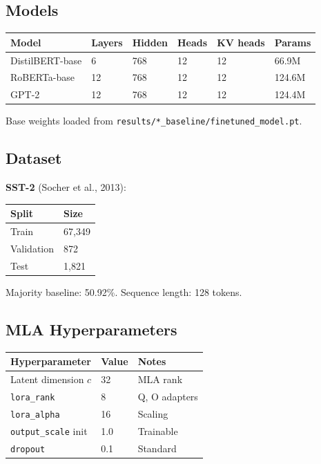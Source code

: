 \subsection{Models}

\begin{table}[H]
\centering
\small
\begin{tabular}{llllll}
\toprule
\textbf{Model} & \textbf{Layers} & \textbf{Hidden} & \textbf{Heads} & \textbf{KV heads} & \textbf{Params} \\
\midrule
DistilBERT-base & 6 & 768 & 12 & 12 & 66.9M \\
RoBERTa-base & 12 & 768 & 12 & 12 & 124.6M \\
GPT-2 & 12 & 768 & 12 & 12 & 124.4M \\
\bottomrule
\end{tabular}
\end{table}

Base weights loaded from \texttt{results/*\_baseline/finetuned\_model.pt}.

\subsection{Dataset}

\textbf{SST-2} (Socher et al., 2013):

\begin{table}[H]
\centering
\small
\begin{tabular}{ll}
\toprule
\textbf{Split} & \textbf{Size} \\
\midrule
Train & 67,349 \\
Validation & 872 \\
Test & 1,821 \\
\bottomrule
\end{tabular}
\end{table}

Majority baseline: 50.92\%. Sequence length: 128 tokens.

\subsection{MLA Hyperparameters}

\begin{table}[H]
\centering
\small
\begin{tabular}{lll}
\toprule
\textbf{Hyperparameter} & \textbf{Value} & \textbf{Notes} \\
\midrule
Latent dimension $c$ & 32 & MLA rank \\
\texttt{lora\_rank} & 8 & Q, O adapters \\
\texttt{lora\_alpha} & 16 & Scaling \\
\texttt{output\_scale} init & 1.0 & Trainable \\
\texttt{dropout} & 0.1 & Standard \\
\bottomrule
\end{tabular}
\end{table}

